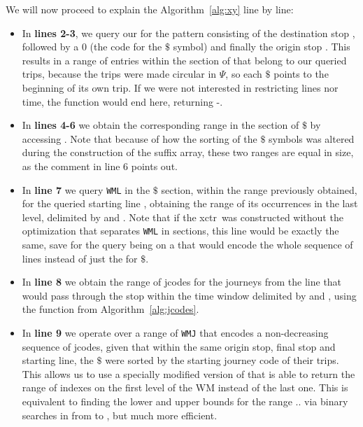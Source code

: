     We will now proceed to explain the Algorithm~\ref{alg:xy} line by line:
    \begin{itemize}
        \item In \textbf{lines 2-3}, we query our  for the pattern consisting of the destination stop , followed by a 0 (the code for the $\$$ symbol) and finally the origin stop . This results in a range of entries within the section of  that belong to our queried trips, because the trips were made circular in $\Psi$, so each $\$$ points to the beginning of its own trip. If we were not interested in restricting lines nor time, the function would end here, returning -.
        
        \item In \textbf{lines 4-6} we obtain the corresponding range in the section of $\$$ by accessing \FuncSty{$\Psi$}. Note that because of how the sorting of the $\$$ symbols was altered during the construction of the suffix array, these two ranges are equal in size, as the comment in line 6 points out.
        
        \item In \textbf{line 7} we query \texttt{WML} in the $\$$ section, within the range previously obtained, for the queried starting line , obtaining the range of its occurrences in the last level, delimited by  and . Note that if the \gls{xctr}~was constructed without the optimization that separates \texttt{WML} in sections, this line would be exactly the same, save for the query being on a  that would encode the whole sequence of lines instead of just the  for $\$$.
        
        \item In \textbf{line 8} we obtain the range of jcodes for the journeys from the line  that would pass through the stop  within the time window delimited by  and , using the function  from Algorithm~\ref{alg:jcodes}.
        
        \item In \textbf{line 9} we operate over a range of \texttt{WMJ} that encodes a non-decreasing sequence of jcodes, given that within the same origin stop, final stop and starting line, the $\$$ were sorted by the starting journey code of their trips. This allows us to use a specially modified version of  that is able to return the range of indexes on the first level of the WM instead of the last one. This is equivalent to finding the lower and upper bounds for the range $..$ via binary searches in  from  to , but much more efficient.
        

\end{itemize}
